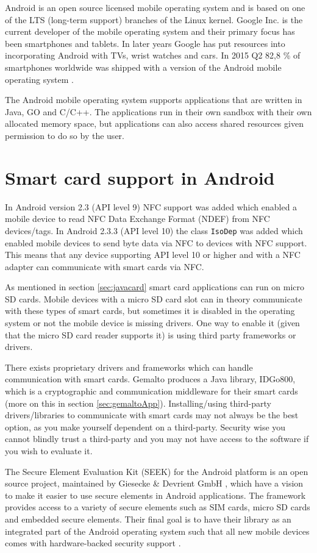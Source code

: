 Android is an open source licensed mobile operating system and is based on one of the LTS (long-term support) branches of the Linux kernel. Google Inc. \cite{google} is the current developer of the mobile operating system and their primary focus has been smartphones and tablets. In later years Google has put resources into incorporating Android with TVs, wrist watches and cars. In 2015 Q2 82,8 \% of smartphones worldwide was shipped with a version of the Android mobile operating system \cite{androidMarketShare}.

The Android mobile operating system supports applications that are written in Java, GO and C/C++. The applications run in their own sandbox with their own allocated memory space, but applications can also access shared resources given permission to do so by the user.

\section{Smart card support in Android}
In Android version 2.3 (API level 9) NFC support was added which enabled a mobile device to read NFC Data Exchange Format (NDEF) from NFC devices/tags. In Android 2.3.3 (API level 10) the class \texttt{IsoDep} was added which enabled mobile devices to send byte data via NFC to devices with NFC support. This means that any device supporting API level 10 or higher and with a NFC adapter can communicate with smart cards via NFC.

As mentioned in section \ref{sec:javacard} smart card applications can run on micro SD cards. Mobile devices with a micro SD card slot can in theory communicate with these types of smart cards, but sometimes it is disabled in the operating system or not the mobile device is missing drivers. One way to enable it (given that the micro SD card reader supports it) is using third party frameworks or drivers.

There exists proprietary drivers and frameworks which can handle communication with smart cards. Gemalto produces a Java library, IDGo800, which is a cryptographic and communication middleware for their smart cards (more on this in section \ref{sec:gemaltoApp}). Installing/using third-party drivers/libraries to communicate with smart cards may not always be the best option, as you make yourself dependent on a third-party. Security wise you cannot blindly trust a third-party and you may not have access to the software if you wish to evaluate it.

The Secure Element Evaluation Kit (SEEK) for the Android platform is an open source project, maintained by Giesecke \& Devrient GmbH \cite{Giesecke}, which have a vision to make it easier to use secure elements in Android applications. The framework provides access to a variety of secure elements such as SIM cards, micro SD cards and embedded secure elements. Their final goal is to have their library as an integrated part of the Android operating system such that all new mobile devices comes with hardware-backed security support \cite{SEEK}.

